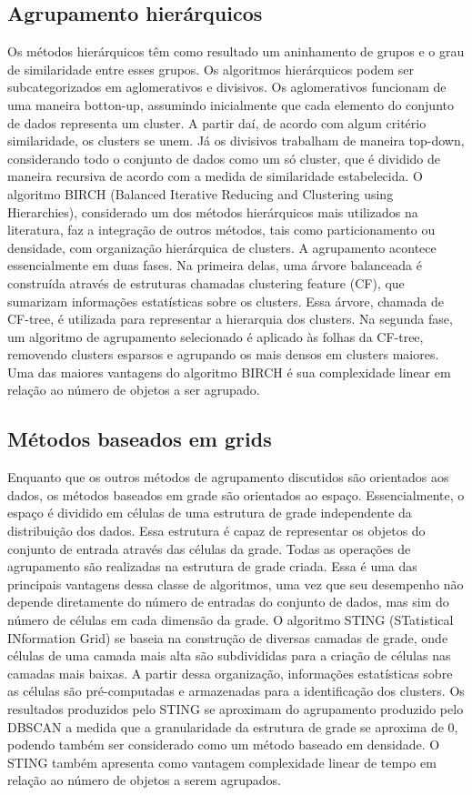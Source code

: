 \subsection{Agrupamento hierárquicos}
Os métodos hierárquicos têm como resultado um aninhamento de grupos e o grau de
similaridade entre esses grupos. Os algoritmos hierárquicos podem ser subcategorizados
em aglomerativos e divisivos. Os aglomerativos funcionam de uma maneira botton-up,
assumindo inicialmente que cada elemento do conjunto de dados representa um cluster. A
partir daí, de acordo com algum critério similaridade, os clusters se unem. Já os divisivos
trabalham de maneira top-down, considerando todo o conjunto de dados como um só
cluster, que é dividido de maneira recursiva de acordo com a medida de similaridade
estabelecida.
O algoritmo BIRCH (Balanced Iterative Reducing and Clustering using Hierarchies),
considerado um dos métodos hierárquicos mais utilizados na literatura, faz a integração
de outros métodos, tais como particionamento ou densidade, com organização hierárquica
de clusters. A agrupamento acontece essencialmente em duas fases. Na primeira delas,
uma árvore balanceada é construída através de estruturas chamadas clustering feature
(CF), que sumarizam informações estatísticas sobre os clusters. Essa árvore, chamada de
CF-tree, é utilizada para representar a hierarquia dos clusters. Na segunda fase, um algoritmo
de agrupamento selecionado é aplicado às folhas da CF-tree, removendo clusters
esparsos e agrupando os mais densos em clusters maiores. Uma das maiores vantagens
do algoritmo BIRCH é sua complexidade linear em relação ao número de objetos a ser
agrupado.

\subsection{Métodos baseados em grids}
Enquanto que os outros métodos de agrupamento discutidos são orientados aos dados,
os métodos baseados em grade são orientados ao espaço. Essencialmente, o espaço
é dividido em células de uma estrutura de grade independente da distribuição dos dados.
Essa estrutura é capaz de representar os objetos do conjunto de entrada através das células
da grade. Todas as operações de agrupamento são realizadas na estrutura de grade
criada. Essa é uma das principais vantagens dessa classe de algoritmos, uma vez que seu
desempenho não depende diretamente do número de entradas do conjunto de dados, mas
sim do número de células em cada dimensão da grade.
O algoritmo STING (STatistical INformation Grid) se baseia na construção de diversas
camadas de grade, onde células de uma camada mais alta são subdivididas para a criação
de células nas camadas mais baixas. A partir dessa organização, informações estatísticas
sobre as células são pré-computadas e armazenadas para a identificação dos clusters.
Os resultados produzidos pelo STING se aproximam do agrupamento produzido pelo
DBSCAN a medida que a granularidade da estrutura de grade se aproxima de 0, podendo
também ser considerado como um método baseado em densidade. O STING também
apresenta como vantagem complexidade linear de tempo em relação ao número de objetos
a serem agrupados.

